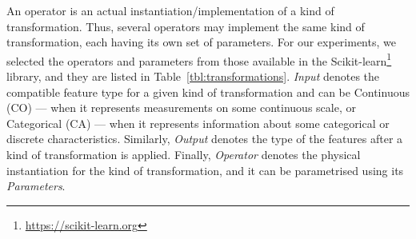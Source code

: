 \begin{example}
An operator is an actual instantiation/implementation of a kind of transformation. Thus, several operators may implement the same kind of transformation, each having its own set of parameters. For our experiments, we selected the operators and parameters from those available in the Scikit-learn\footnote{\url{https://scikit-learn.org}} library, and they are listed in Table~\ref{tbl:transformations}. \textit{Input} denotes the compatible feature type for a given kind of transformation and can be Continuous (CO) --- when it represents measurements on some continuous scale, or Categorical (CA) --- when it represents information about some categorical or discrete characteristics. Similarly, \textit{Output} denotes the type of the features after a kind of transformation is applied. Finally, \textit{Operator} denotes the physical instantiation for the kind of transformation, and it can be parametrised using its \textit{Parameters}.
\end{example}

